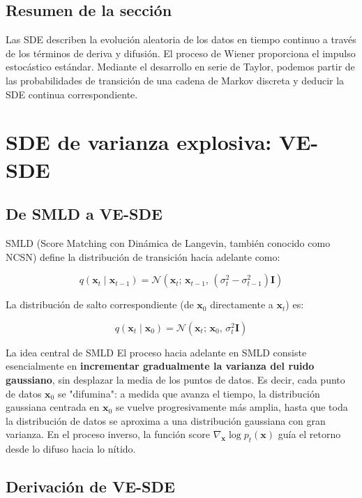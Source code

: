 \documentclass[a4paper]{article}
\begin{document}
\subsection{Resumen de la sección}

Las SDE describen la evolución aleatoria de los datos en tiempo continuo a través de los términos de deriva y difusión. El proceso de Wiener proporciona el impulso estocástico estándar. Mediante el desarrollo en serie de Taylor, podemos partir de las probabilidades de transición de una cadena de Markov discreta y deducir la SDE continua correspondiente.
\section{SDE de varianza explosiva: VE-SDE}

\subsection{De SMLD a VE-SDE}

SMLD (Score Matching con Dinámica de Langevin, también conocido como NCSN) define la distribución de transición hacia adelante como:

$$
q(\mathbf{x}_t \mid \mathbf{x}_{t-1}) = \mathcal{N}\!\left(\mathbf{x}_t;\, \mathbf{x}_{t-1},\, (\sigma_t^2 - \sigma_{t-1}^2)\mathbf{I}\right)
$$

La distribución de salto correspondiente (de $\mathbf{x}_0$ directamente a $\mathbf{x}_t$) es:

$$
q(\mathbf{x}_t \mid \mathbf{x}_0) = \mathcal{N}\!\left(\mathbf{x}_t;\, \mathbf{x}_0,\, \sigma_t^2 \mathbf{I}\right)
$$

\begin{importantbox}{La idea central de SMLD}
El proceso hacia adelante en SMLD consiste esencialmente en \textbf{incrementar gradualmente la varianza del ruido gaussiano}, sin desplazar la media de los puntos de datos. Es decir, cada punto de datos $\mathbf{x}_0$ se "difumina": a medida que avanza el tiempo, la distribución gaussiana centrada en $\mathbf{x}_0$ se vuelve progresivamente más amplia, hasta que toda la distribución de datos se aproxima a una distribución gaussiana con gran varianza. En el proceso inverso, la función score $\nabla_{\mathbf{x}} \log p_t(\mathbf{x})$ guía el retorno desde lo difuso hacia lo nítido.
\end{importantbox}

\subsection{Derivación de VE-SDE}
\end{document}
